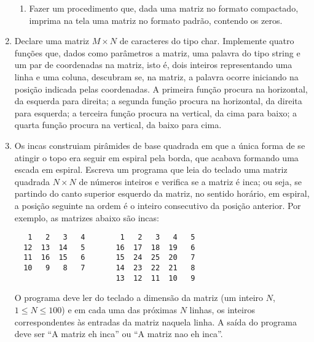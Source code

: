 \begin{enumerate}
\begin {enumerate}
\item Fazer um procedimento que, dada uma matriz no formato compactado,
imprima na tela uma matriz no formato padrão, contendo os zeros.

\end{enumerate}




\item Declare uma matriz $M \times N$ de caracteres do
  tipo \textsf{char}.  Implemente quatro funções que, dados como
  parâmetros a matriz, uma palavra do tipo \textsf{string} e um par de
  coordenadas na matriz, isto é, dois inteiros representando uma linha e
  uma coluna,  descubram se,  na matriz, a  palavra ocorre  iniciando na
  posição indicada pelas coordenadas. 
A primeira função procura na horizontal, da esquerda para direita;
a segunda função procura na horizontal, da direita para esquerda;
a terceira função procura na vertical, da cima para baixo;
a quarta função procura na vertical, da baixo para cima.




\item Os incas construiam pirâmides de base quadrada em
que a única forma de se atingir o topo era seguir em espiral pela
borda, que acabava formando uma escada em espiral.  Escreva um
programa que leia do teclado uma matriz quadrada $N \times N$ de
números inteiros e verifica se a matriz é inca; ou seja, se partindo
do canto superior esquerdo da matriz, no sentido horário, em espiral,
a posição seguinte na ordem é o inteiro consecutivo da posição
anterior.  Por exemplo, as matrizes abaixo são incas:

\begin{verbatim}
   1   2   3   4        1   2   3   4   5
  12  13  14   5       16  17  18  19   6        
  11  16  15   6       15  24  25  20   7
  10   9   8   7       14  23  22  21   8
                       13  12  11  10   9
\end{verbatim}

O programa deve ler do teclado a dimensão da matriz 
(um inteiro $N$, $1 \leq N \leq 100$) e em cada uma das próximas $N$ linhas, 
os inteiros correspondentes às  entradas da matriz naquela linha.  
A saída do programa deve ser
``A matriz eh inca'' ou ``A matriz nao eh inca''.


\end{enumerate}
